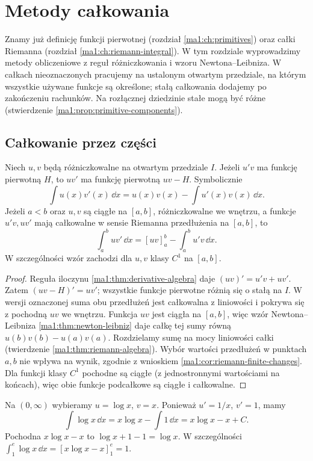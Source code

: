 \chapter{Metody całkowania}
\label{ma1:ch:integration-methods}

Znamy już definicję funkcji pierwotnej (rozdział \ref{ma1:ch:primitives}) oraz całki Riemanna (rozdział \ref{ma1:ch:riemann-integral}). W tym rozdziale wyprowadzimy metody obliczeniowe z reguł różniczkowania i wzoru Newtona--Leibniza. W całkach nieoznaczonych pracujemy na ustalonym otwartym przedziale, na którym wszystkie używane funkcje są określone; stałą całkowania dodajemy po zakończeniu rachunków. Na rozłącznej dziedzinie stałe mogą być różne (stwierdzenie \ref{ma1:prop:primitive-components}).

\section{Całkowanie przez części}
\begin{twierdzenie}
\label{ma1:thm:integration-by-parts}
Niech $u,v$ będą różniczkowalne na otwartym przedziale $I$. Jeżeli $u'v$ ma funkcję pierwotną $H$, to $uv'$ ma funkcję pierwotną $uv-H$. Symbolicznie
\[
 \int u(x)v'(x)\,\dd x
 =u(x)v(x)-\int u'(x)v(x)\,\dd x.
\]
Jeżeli $a<b$ oraz $u,v$ są ciągłe na $[a,b]$, różniczkowalne we wnętrzu, a funkcje $u'v,uv'$ mają całkowalne w sensie Riemanna przedłużenia na $[a,b]$, to
\[
 \int_a^b uv'\,\dd x=[uv]_a^b-\int_a^b u'v\,\dd x.
\]
W szczególności wzór zachodzi dla $u,v$ klasy $C^1$ na $[a,b]$.
\end{twierdzenie}
\begin{proof}
Reguła iloczynu \ref{ma1:thm:derivative-algebra} daje $(uv)'=u'v+uv'$. Zatem $(uv-H)'=uv'$; wszystkie funkcje pierwotne różnią się o stałą na $I$. W wersji oznaczonej suma obu przedłużeń jest całkowalna z liniowości i pokrywa się z pochodną $uv$ we wnętrzu. Funkcja $uv$ jest ciągła na $[a,b]$, więc wzór Newtona--Leibniza \ref{ma1:thm:newton-leibniz} daje całkę tej sumy równą $u(b)v(b)-u(a)v(a)$. Rozdzielamy sumę na mocy liniowości całki (twierdzenie \ref{ma1:thm:riemann-algebra}). Wybór wartości przedłużeń w punktach $a,b$ nie wpływa na wynik, zgodnie z wnioskiem \ref{ma1:cor:riemann-finite-changes}. Dla funkcji klasy $C^1$ pochodne są ciągłe (z jednostronnymi wartościami na końcach), więc obie funkcje podcałkowe są ciągłe i całkowalne.
\end{proof}
\begin{przyklad}
\label{ma1:ex:parts-log}
Na $(0,\infty)$ wybieramy $u=\log x$, $v=x$. Ponieważ $u'=1/x$, $v'=1$, mamy
\[
 \int\log x\,\dd x=x\log x-\int1\,\dd x=x\log x-x+C.
\]
Pochodna $x\log x-x$ to $\log x+1-1=\log x$. W szczególności $\int_1^e\log x\,\dd x=[x\log x-x]_1^e=1$.
\end{przyklad}
